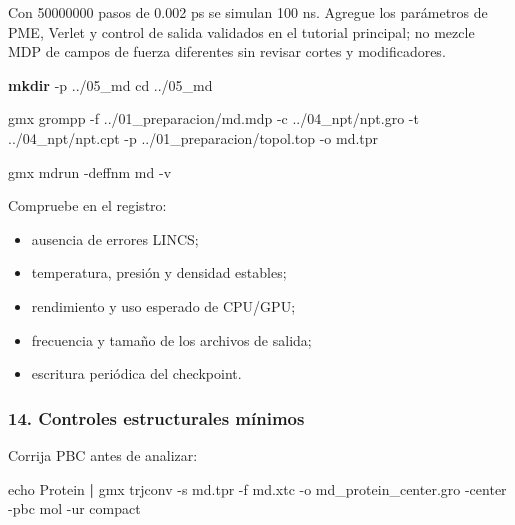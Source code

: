 \documentclass[
  spanish,
  11pt,
  a4paper]{article}
\newenvironment{Shaded}{\begin{snugshade}}{\end{snugshade}}
\newcommand{\AttributeTok}[1]{\textcolor[rgb]{0.13,0.29,0.53}{#1}}
\newcommand{\BuiltInTok}[1]{#1}
\newcommand{\ExtensionTok}[1]{#1}
\newcommand{\FunctionTok}[1]{\textcolor[rgb]{0.13,0.29,0.53}{\textbf{#1}}}
\newcommand{\KeywordTok}[1]{\textcolor[rgb]{0.13,0.29,0.53}{\textbf{#1}}}
\newcommand{\NormalTok}[1]{#1}
\providecommand{\tightlist}{%
  \setlength{\itemsep}{0pt}\setlength{\parskip}{0pt}}
\begin{document}
Con 50000000 pasos de 0.002 ps se simulan 100 ns. Agregue los parámetros
de PME, Verlet y control de salida validados en el tutorial principal;
no mezcle MDP de campos de fuerza diferentes sin revisar cortes y
modificadores.

\begin{Shaded}
\begin{Highlighting}[]
\FunctionTok{mkdir} \AttributeTok{{-}p}\NormalTok{ ../05\_md}
\BuiltInTok{cd}\NormalTok{ ../05\_md}

\ExtensionTok{gmx}\NormalTok{ grompp     }\AttributeTok{{-}f}\NormalTok{ ../01\_preparacion/md.mdp     }\AttributeTok{{-}c}\NormalTok{ ../04\_npt/npt.gro     }\AttributeTok{{-}t}\NormalTok{ ../04\_npt/npt.cpt     }\AttributeTok{{-}p}\NormalTok{ ../01\_preparacion/topol.top     }\AttributeTok{{-}o}\NormalTok{ md.tpr}

\ExtensionTok{gmx}\NormalTok{ mdrun }\AttributeTok{{-}deffnm}\NormalTok{ md }\AttributeTok{{-}v}
\end{Highlighting}
\end{Shaded}

Compruebe en el registro:

\begin{itemize}
\tightlist
\item
  ausencia de errores LINCS;
\item
  temperatura, presión y densidad estables;
\item
  rendimiento y uso esperado de CPU/GPU;
\item
  frecuencia y tamaño de los archivos de salida;
\item
  escritura periódica del checkpoint.
\end{itemize}

\subsubsection{14. Controles estructurales
mínimos}\label{controles-estructurales-muxednimos}

Corrija PBC antes de analizar:

\begin{Shaded}
\begin{Highlighting}[]
\BuiltInTok{echo}\NormalTok{ Protein }\KeywordTok{|}
\ExtensionTok{gmx}\NormalTok{ trjconv     }\AttributeTok{{-}s}\NormalTok{ md.tpr     }\AttributeTok{{-}f}\NormalTok{ md.xtc     }\AttributeTok{{-}o}\NormalTok{ md\_protein\_center.gro     }\AttributeTok{{-}center}     \AttributeTok{{-}pbc}\NormalTok{ mol     }\AttributeTok{{-}ur}\NormalTok{ compact}
\end{Highlighting}
\end{Shaded}
\end{document}
